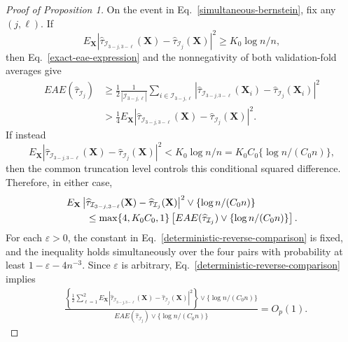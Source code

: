\documentclass[11pt]{article}
\theoremstyle{referenceplain}
\theoremstyle{referencedefinition}
\theoremstyle{referenceremark}
\begin{document}
\begin{proof}[Proof of Proposition 1]
On the event in Eq.~\eqref{simultaneous-bernstein}, fix any
$(j,\ell)$. If
\[
E_{\mathbf X}\left|
\widehat\tau_{\mathcal I_{3-j,3-\ell}}(\mathbf X)
-\widehat\tau_{\mathcal I_j}(\mathbf X)
\right|^2
\ge K_0\log n/n,
\]
then Eq.~\eqref{exact-eae-expression} and the nonnegativity of both
validation-fold averages give
\begin{align*}
EAE(\widehat\tau_{\mathcal I_j})
&\ge
\frac12
\frac{1}{|\mathcal I_{3-j,\ell}|}
\sum_{i\in\mathcal I_{3-j,\ell}}
\left|
\widehat\tau_{\mathcal I_{3-j,3-\ell}}(\mathbf X_i)
-\widehat\tau_{\mathcal I_j}(\mathbf X_i)
\right|^2\\
&>
\frac14
E_{\mathbf X}\left|
\widehat\tau_{\mathcal I_{3-j,3-\ell}}(\mathbf X)
-\widehat\tau_{\mathcal I_j}(\mathbf X)
\right|^2.
\end{align*}
If instead
\[
E_{\mathbf X}\left|
\widehat\tau_{\mathcal I_{3-j,3-\ell}}(\mathbf X)
-\widehat\tau_{\mathcal I_j}(\mathbf X)
\right|^2
<K_0\log n/n
=
K_0{C_0}\{\log n/({C_0}n)\},
\]
then the common truncation level controls this conditional squared
difference. Therefore, in either case,
\begin{align}
&
E_{\mathbf X}\left|
\widehat\tau_{\mathcal I_{3-j,3-\ell}}(\mathbf X)
-\widehat\tau_{\mathcal I_j}(\mathbf X)
\right|^2
\vee\{\log n/({C_0}n)\}
\notag\\
&\qquad\le
\max\{4,K_0{C_0},1\}
\left[
EAE(\widehat\tau_{\mathcal I_j})
\vee\{\log n/({C_0}n)\}
\right].
\label{deterministic-reverse-comparison}
\end{align}
For each $\varepsilon>0$, the constant in
Eq.~\eqref{deterministic-reverse-comparison} is fixed, and the
inequality holds simultaneously over the four pairs with probability
at least $1-\varepsilon-4n^{-3}$. Since $\varepsilon$ is arbitrary,
Eq.~\eqref{deterministic-reverse-comparison} implies
\begin{align}
&
\frac{
\left\{
\displaystyle
\frac12\sum_{\ell=1}^2
E_{\mathbf X}\left|
\widehat\tau_{\mathcal I_{3-j,3-\ell}}(\mathbf X)
-\widehat\tau_{\mathcal I_j}(\mathbf X)
\right|^2
\right\}
\vee\{\log n/({C_0}n)\}
}{
EAE(\widehat\tau_{\mathcal I_j})\vee\{\log n/({C_0}n)\}
}
=O_p(1).
\label{bernstein-direction}
\end{align}


\end{proof}
\end{document}
